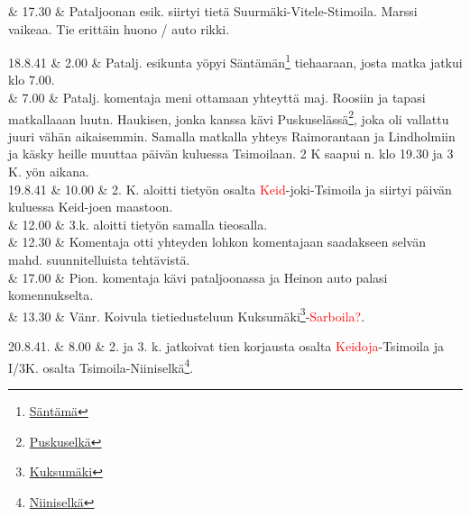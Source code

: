 \documentclass[11pt,a5paper,oneside]{book}
\begin{document}
& 17.30 & Pataljoonan esik. siirtyi tietä Suurmäki-Vitele-Stimoila. Marssi vaikeaa. Tie erittäin huono / auto rikki. \\
\newpage

18.8.41 & 2.00 & Patalj. esikunta yöpyi Säntämän\footnote{\href{https://www.google.fi/maps/place/Syandeba,+Republic+of+Karelia,+Russia,+186006/}{Säntämä}} tiehaaraan, josta matka jatkui klo 7.00. \\ 

& 7.00 & Patalj. komentaja meni ottamaan yhteyttä maj. Roosiin ja tapasi matkallaaan luutn. Haukisen, jonka kanssa kävi Puskuselässä\footnote{\href{https://www.google.fi/maps/place/61\%C2\%B016'38.2\%22N+32\%C2\%B057'08.2\%22E/@61.277273,32.9500943,905m/}{Puskuselkä}}, joka oli vallattu juuri vähän aikaisemmin. Samalla matkalla yhteys Raimorantaan ja Lindholmiin ja käsky heille muuttaa päivän kuluessa Tsimoilaan. 2 K saapui n. klo 19.30 ja 3 K. yön aikana. \newline\newline\newline \\

19.8.41 & 10.00 & 2. K. aloitti tietyön osalta \textcolor{red}{Keid}-joki-Tsimoila ja siirtyi päivän kuluessa Keid-joen maastoon. \\

& 12.00 & 3.k. aloitti tietyön samalla tieosalla. \\

& 12.30 & Komentaja otti yhteyden lohkon komentajaan saadakseen selvän mahd. suunnitelluista tehtävistä. \\

& 17.00 & Pion. komentaja kävi pataljoonassa ja Heinon auto palasi komennukselta. \\

& 13.30 & Vänr. Koivula tietiedusteluun Kuksumäki\footnote{\href{https://www.google.fi/maps/place/\%D0\%9A\%D1\%83\%CC\%81\%D0\%BA\%D1\%88\%D0\%B5\%D0\%B3\%D0\%BE\%D1\%80\%D1\%8B,+Republic+of+Karelia,+Russia,+186006/}{Kuksumäki}}-\textcolor{red}{Sarboila?}. \\

\taulustop


20.8.41. & 8.00 & 2. ja 3. k. jatkoivat tien korjausta osalta \textcolor{red}{Keidoja}-Tsimoila ja I/3K. osalta Tsimoila-Niiniselkä\footnote{\href{https://www.google.fi/maps/place/61\%C2\%B017'48.2\%22N+32\%C2\%B052'52.5\%22E/@61.296723,32.8790573,904m/}{Niiniselkä}}. \\
\end{document}
